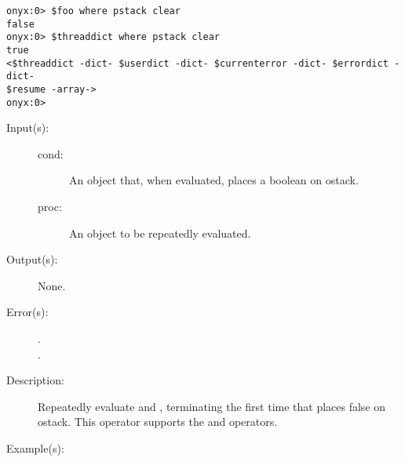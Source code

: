 \begin{description}
\begin{description}
\begin{verbatim}
onyx:0> $foo where pstack clear
false
onyx:0> $threaddict where pstack clear
true
<$threaddict -dict- $userdict -dict- $currenterror -dict- $errordict -dict-
$resume -array->
onyx:0>
		\end{verbatim}
	\end{description}
\label{systemdict:while}
\item[{\onyxop{cond proc}{while}{--}}: ]
	\begin{description}\item[]
	\item[Input(s): ]
		\begin{description}\item[]
		\item[cond: ]
			An object that, when evaluated, places a boolean on
			ostack.
		\item[proc: ]
			An object to be repeatedly evaluated.
		\end{description}
	\item[Output(s): ] None.
	\item[Error(s): ]
		\begin{description}\item[]
		\item[.]
		\item[.]
		\end{description}
	\item[Description: ]
		Repeatedly evaluate  and , terminating
		the first time that  places false on ostack.  This
		operator supports the
		 and
		 operators.
	\item[Example(s): ]\begin{verbatim}


\end{verbatim}
\end{description}
\end{description}
